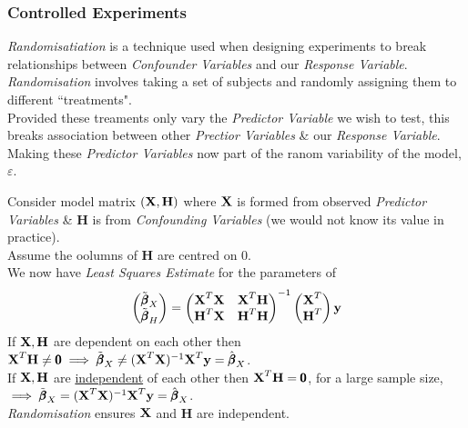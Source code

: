 \documentclass[11pt,a4paper]{article}
\begin{document}
\subsubsection{Controlled Experiments}

\textit{Randomisatiation} is a technique used when designing experiments to break relationships between \textit{Confounder Variables} and our \textit{Response Variable}.\\
\textit{Randomisation} involves taking a set of subjects and randomly assigning them to different ``treatments".\\
Provided these treaments only vary the \textit{Predictor Variable} we wish to test, this breaks association between other \textit{Prectior Variables} \& our \textit{Response Variable}. Making these \textit{Predictor Variables} now part of the ranom variability of the model, $\varepsilon$.\\
 

Consider model matrix $(\textbf{X},\textbf{H})$ where $\textbf{X}$ is formed from observed \textit{Predictor Variables} \& $\textbf{H}$ is from \textit{Confounding Variables} (\nb we would not know its value in practice).\\
Assume the oolumns of $\textbf{H}$ are centred on 0.\\
We now have \textit{Least Squares Estimate} for the parameters of
$$\begin{pmatrix}\tilde{\pmb\beta}_X\\\tilde{\pmb\beta}_H\end{pmatrix}=\begin{pmatrix}\textbf{X}^T\textbf{X}&\textbf{X}^T\textbf{H}\\\textbf{H}^T\textbf{X}&\textbf{H}^T\textbf{H}\end{pmatrix}^{-1}\begin{pmatrix}\textbf{X}^T\\\textbf{H}^T\end{pmatrix}\textbf{y}$$
If $\textbf{X},\textbf{H}$ are dependent on each other then $\textbf{X}^T\textbf{H}\neq\pmb0\implies\tilde{\pmb\beta}_X\neq(\textbf{X}^T\textbf{X})^{-1}\textbf{X}^T\textbf{y}=\hat{\pmb\beta}_X$.\\
If $\textbf{X},\textbf{H}$ are \underline{independent} of each other then $\textbf{X}^T\textbf{H}=\pmb0$, for a large sample size,\\
$\implies\tilde{\pmb\beta}_X=(\textbf{X}^T\textbf{X})^{-1}\textbf{X}^T\textbf{y}=\hat{\pmb\beta}_X$.\\
\nb \textit{Randomisation} ensures $\textbf{X}$ and $\textbf{H}$ are independent.
\end{document}

